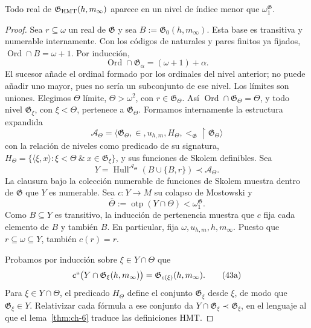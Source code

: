 \begin{lemma}
\label{thm:ch-8}
Todo real de
\(\mathfrak G_{\rm HMT}(h,m_\infty)\) aparece en un nivel de índice menor que
\(\omega_1^{\mathfrak G}\).

\end{lemma}
\begin{proof}
Sea \(r\subseteq\omega\) un real de \(\mathfrak G\) y sea
\(B:=\mathfrak G_0(h,m_\infty)\). Esta base es transitiva y numerable
internamente. Con los códigos de naturales y pares finitos ya fijados,
\(\operatorname{Ord}\cap B=\omega+1\). Por inducción,
\[
 \operatorname{Ord}\cap\mathfrak G_\alpha=(\omega+1)+\alpha.
\]
El sucesor añade el ordinal formado por los ordinales del nivel anterior;
no puede añadir uno mayor, pues no sería un subconjunto de ese nivel. Los
límites son uniones. Elegimos \(\Theta\) límite, \(\Theta>\omega^2\),
con \(r\in\mathfrak G_\Theta\). Así
\(\operatorname{Ord}\cap\mathfrak G_\Theta=\Theta\), y todo nivel
\(\mathfrak G_\xi\), con \(\xi<\Theta\), pertenece a
\(\mathfrak G_\Theta\). Formamos internamente la estructura expandida
\[
 \mathcal A_\Theta=
 \langle\mathfrak G_\Theta,\in,u_{h,m},
         H_\Theta,<_{\mathfrak G}\!\upharpoonright\mathfrak G_\Theta\rangle
\]
con la relación de niveles como predicado de su signatura,
\(H_\Theta=\{\langle\xi,x\rangle:\xi<\Theta\ \&\
x\in\mathfrak G_\xi\}\), y sus funciones de Skolem definibles. Sea
\[
 Y=\operatorname{Hull}^{\mathcal A_\Theta}
   (B\cup\{B,r\})\prec\mathcal A_\Theta .
\]
La clausura bajo la colección numerable de funciones de Skolem muestra dentro
de \(\mathfrak G\) que \(Y\) es numerable. Sea
\(c:Y\rightarrow M\) su colapso de Mostowski y
\[
 \bar\Theta:=\operatorname{otp}(Y\cap\Theta)
 <\omega_1^{\mathfrak G}.
\]
Como \(B\subseteq Y\) es transitivo, la inducción de pertenencia muestra
que \(c\) fija cada elemento de \(B\) y también \(B\). En particular,
fija \(\omega,u_{h,m},h,m_\infty\). Puesto que
\(r\subseteq\omega\subseteq Y\), también \(c(r)=r\).

Probamos por inducción sobre \(\xi\in Y\cap\Theta\) que
\[
 c``\bigl(Y\cap\mathfrak G_\xi(h,m_\infty)\bigr)
 =\mathfrak G_{c(\xi)}(h,m_\infty).
\tag{43a}\label{eq:ch-condensacion}
\]
Para \(\xi\in Y\cap\Theta\), el predicado \(H_\Theta\) define el
conjunto \(\mathfrak G_\xi\) desde \(\xi\), de modo que
\(\mathfrak G_\xi\in Y\). Relativizar cada fórmula a ese conjunto da
\(Y\cap\mathfrak G_\xi\prec\mathfrak G_\xi\), en el lenguaje al que
el lema~\ref{thm:ch-6} traduce las definiciones HMT.


\end{proof}
